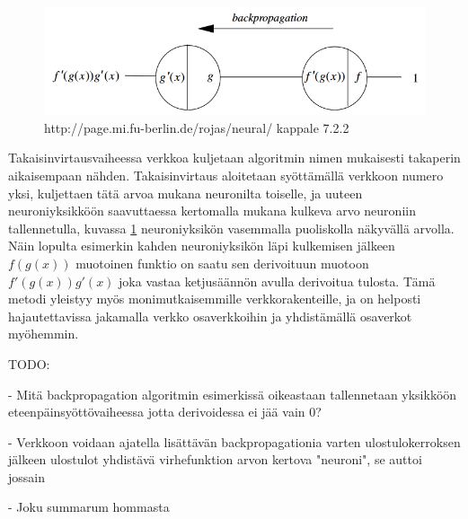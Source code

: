 \documentclass[finnish]{tktltiki2}
\theoremstyle{definition}
\theoremstyle{remark}
\begin{document}
  \begin{figure}[h]
    \label{pic:backpropagation}
    \centering
    \includegraphics[scale=0.5]{backpropagation}
    \caption{http://page.mi.fu-berlin.de/rojas/neural/ kappale 7.2.2}
  \end{figure}

  Takaisinvirtausvaiheessa verkkoa kuljetaan algoritmin nimen mukaisesti takaperin aikaisempaan nähden. Takaisinvirtaus aloitetaan syöttämällä verkkoon numero yksi, kuljettaen tätä arvoa mukana neuronilta toiselle, ja uuteen neuroniyksikköön saavuttaessa kertomalla mukana kulkeva arvo neuroniin tallennetulla, kuvassa \ref{pic:backpropagation} neuroniyksikön vasemmalla puoliskolla näkyvällä arvolla. Näin lopulta esimerkin kahden neuroniyksikön läpi kulkemisen jälkeen $f(g(x))$ muotoinen funktio on saatu sen derivoituun muotoon $f'(g(x))g'(x)$ joka vastaa ketjusäännön avulla derivoitua tulosta. Tämä metodi yleistyy myös monimutkaisemmille verkkorakenteille, ja on helposti hajautettavissa jakamalla verkko osaverkkoihin ja yhdistämällä osaverkot myöhemmin.

  TODO:

  - Mitä backpropagation algoritmin esimerkissä oikeastaan tallennetaan yksikköön eteenpäinsyöttövaiheessa jotta derivoidessa ei jää vain 0?

  - Verkkoon voidaan ajatella lisättävän backpropagationia varten ulostulokerroksen jälkeen ulostulot yhdistävä virhefunktion arvon kertova "neuroni", se auttoi jossain

  - Joku summarum hommasta




  
\end{document}
